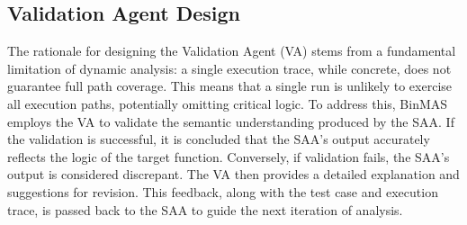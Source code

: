 \documentclass[acmsmall,screen,review,anonymous]{acmart} %
\begin{document}






\subsection{Validation Agent Design}

The rationale for designing the Validation Agent (VA) stems from a fundamental limitation of dynamic analysis: a single execution trace, while concrete, does not guarantee full path coverage. This means that a single run is unlikely to exercise all execution paths, potentially omitting critical logic. To address this, BinMAS employs the VA to validate the semantic understanding produced by the SAA. If the validation is successful, it is concluded that the SAA's output accurately reflects the logic of the target function. Conversely, if validation fails, the SAA's output is considered discrepant. The VA then provides a detailed explanation and suggestions for revision. This feedback, along with the test case and execution trace, is passed back to the SAA to guide the next iteration of analysis.
\end{document}
